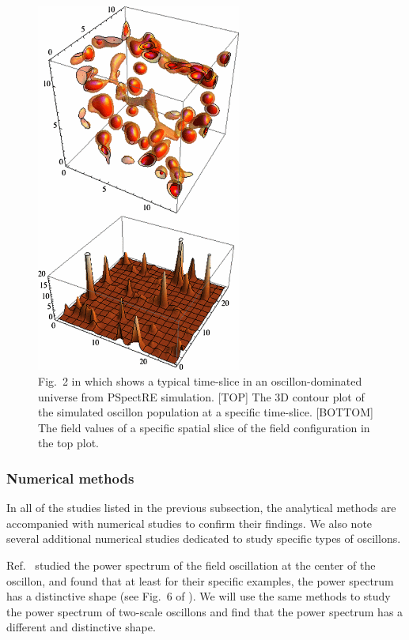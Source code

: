 \documentclass[11pt]{book}
\begin{document}
\begin{figure}
  \centering
  \includegraphics[width=0.6\textwidth]{plot/oscillons-2.png}
  \caption{Fig.~2 in \cite{Amin:2011hj} which shows a typical time-slice in an oscillon-dominated universe from PSpectRE \cite{Easther:2010qz} simulation. [TOP] The 3D contour plot of the simulated oscillon population at a specific time-slice. [BOTTOM] The field values of a specific spatial slice of the field configuration in the top plot.}\label{monodromyoscillons}
\end{figure}

\subsubsection{Numerical methods}
In all of the studies listed in the previous subsection, the analytical methods are accompanied with numerical studies to confirm their findings. We also note several additional numerical studies dedicated to study specific types of oscillons.

Ref.~\cite{Salmi:2012ta} studied the power spectrum of the field oscillation at the center of the oscillon, and found that at least for their specific examples, the power spectrum has a distinctive shape (see Fig.~6 of \cite{Hindmarsh:2006ur}). We will use the same methods to study the power spectrum of two-scale oscillons and find that the power spectrum has a different and distinctive shape.
\end{document}
